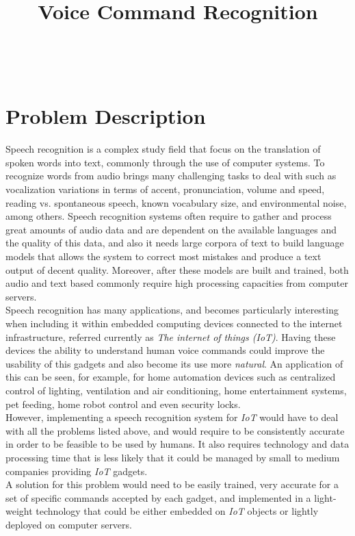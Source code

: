 \documentclass[anon]{CI}
\title[Voice Command Recognition]{Voice Command Recognition}
\author{\Name{Javier Fern\'andez} \Email{javierfdr@gmail.com}\\
 \AND
 \Name{Alejandro Hern\'andez} \Email{alejandro.ajhr@gmail.com}\\
 }
\begin{document}
\maketitle

\section{Problem Description}

Speech recognition is a complex study field that focus on the translation of spoken words into text, commonly through the use of computer systems. To recognize words from audio brings many challenging tasks to deal with such as vocalization variations in terms of accent, pronunciation, volume and speed, reading vs. spontaneous speech, known vocabulary size, and environmental noise, among others. Speech recognition systems often require to gather and process great amounts of audio data and are dependent on the available languages and the quality of this data, and also it needs large corpora of text to build language models that allows the system to correct most mistakes and produce a text output of decent quality. Moreover, after these models are built and trained, both audio and text based commonly require high processing capacities from computer servers.\\

Speech recognition has many applications, and becomes particularly interesting when including it within embedded computing devices connected to the internet infrastructure, referred currently as \emph{The internet of things (IoT)}. Having these devices the ability to understand human voice commands could improve the usability of this gadgets and also become its use more \emph{natural}. An application of this can be seen, for example, for home automation devices such as  centralized control of lighting, ventilation and air conditioning, home entertainment systems, pet feeding, home robot control and even security locks.\\
However, implementing a speech recognition system for \emph{IoT} would have to deal with all the problems listed above, and would require to be consistently accurate in order to be feasible to be used by humans. It also requires technology and data processing time that is less likely that it could be managed by small to medium companies providing \emph{IoT} gadgets.\\

A solution for this problem would need to be easily trained, very accurate for a set of specific commands accepted by each gadget, and implemented in a light-weight technology that could be either embedded on \emph{IoT} objects or lightly deployed on computer servers.
\end{document}
